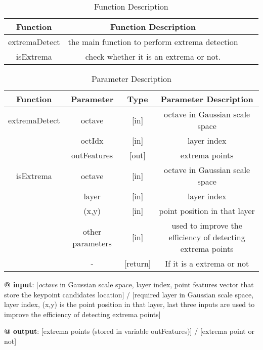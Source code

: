\documentclass[paper=a4, fontsize=11pt]{scrartcl} %
\numberwithin{equation}{section} %
\numberwithin{figure}{section} %
\numberwithin{table}{section} %
\begin{document}
\begin{table}[h]
    \centering
    \begin{tabular}{|c|c| lp{}}
        \hline
        \textbf{Function} & \textbf{Function Description} \\\hline
          extremaDetect & the main function to perform extrema detection \\\hline
              isExtrema & check whether it is an extrema or not. \\\hline
    \end{tabular}
    \caption{Function Description}\label{nolock}
\end{table}

\begin{table}[h]
    \centering
    \begin{tabular}{|c|c|c|c|}
        \hline
        \textbf{Function} & \textbf{Parameter} & \textbf{Type} & \textbf{Parameter Description} \\\hline
        extremaDetect & octave & [in] & octave in Gaussian scale space \\
                        & octIdx &[in] & layer index \\
                        & outFeatures &[out] & extrema points \\\hline
        isExtrema & octave & [in] & octave in Gaussian scale space \\
                  & layer & [in] & layer index \\
                  & (x,y) & [in] & point position in that layer \\
                  & other parameters & [in] & used to improve the efficiency of detecting extrema points\\
                        & - &[return] & If it is a extrema or not \\\hline
    \end{tabular}
    \caption{Parameter Description}\label{nolock}
\end{table}

\textbf{@ input}: [\textsl{octave} in Gaussian scale space, layer index, point features vector that store the keypoint candidates location] / [required layer in Gaussian scale space, layer index, (x,y) is the point position in that layer, last three inputs are used to improve the efficiency of detecting extrema points]

\textbf{@ output}: [extrema points (stored in variable outFeatures)] / [extrema point or not]
\end{document}
